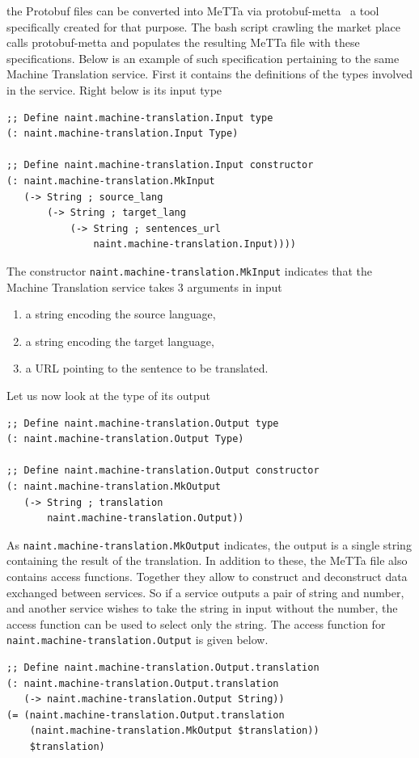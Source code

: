 \documentclass[]{report}
\begin{document}
the Protobuf files can be converted into MeTTa via
protobuf-metta~\cite{ProtoMeTTa} a tool specifically created for that
purpose.  The bash script crawling the market place calls
protobuf-metta and populates the resulting MeTTa file with these
specifications.  Below is an example of such specification pertaining
to the same Machine Translation service.  First it contains the
definitions of the types involved in the service.  Right below is its
input type
\begin{verbatim}
;; Define naint.machine-translation.Input type
(: naint.machine-translation.Input Type)

;; Define naint.machine-translation.Input constructor
(: naint.machine-translation.MkInput
   (-> String ; source_lang
       (-> String ; target_lang
           (-> String ; sentences_url
               naint.machine-translation.Input))))
\end{verbatim}
The constructor \texttt{naint.machine-translation.MkInput}
indicates that the Machine Translation service takes 3 arguments in
input
\begin{enumerate}
\item a string encoding the source language,
\item a string encoding the target language,
\item a URL pointing to the sentence to be translated.
\end{enumerate}
Let us now look at the type of its output
\begin{verbatim}
;; Define naint.machine-translation.Output type
(: naint.machine-translation.Output Type)

;; Define naint.machine-translation.Output constructor
(: naint.machine-translation.MkOutput
   (-> String ; translation
       naint.machine-translation.Output))
\end{verbatim}
As \texttt{naint.machine-translation.MkOutput} indicates,
the output is a single string containing the result of the
translation.  In addition to these, the MeTTa file also contains
access functions.  Together they allow to construct and deconstruct
data exchanged between services.  So if a service outputs a pair of
string and number, and another service wishes to take the string in
input without the number, the access function can be used to select
only the string.  The access function for
\texttt{naint.machine-translation.Output} is given below.
\begin{verbatim}
;; Define naint.machine-translation.Output.translation
(: naint.machine-translation.Output.translation
   (-> naint.machine-translation.Output String))
(= (naint.machine-translation.Output.translation
    (naint.machine-translation.MkOutput $translation))
    $translation)
\end{verbatim}
\end{document}

